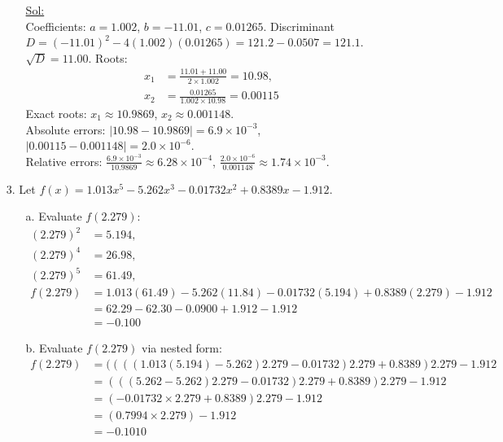 \begin{enumerate}
\begin{itemize}
        \underline{Sol:} \\
        Coefficients: \( a = 1.002 \), \( b = -11.01 \), \( c = 0.01265 \).
        Discriminant \( D = (-11.01)^2 - 4(1.002)(0.01265) = 121.2 -
        0.0507 = 121.1 \).
        \( \sqrt{D} = 11.00 \).
        Roots:
        \[
          \begin{aligned}
            x_1 &= \frac{11.01 + 11.00}{2 \times 1.002} = 10.98, \\
            x_2 &= \frac{0.01265}{1.002 \times 10.98} = 0.00115
          \end{aligned}
        \]
        Exact roots: \( x_1 \approx 10.9869 \), \( x_2 \approx 0.001148 \). \\
        Absolute errors: \( |10.98 - 10.9869| = 6.9 \times 10^{-3}
        \), \( |0.00115 - 0.001148| = 2.0 \times 10^{-6} \).  \\
        Relative errors: \( \frac{6.9 \times 10^{-3}}{10.9869}
        \approx 6.28 \times 10^{-4} \), \( \frac{2.0 \times
        10^{-6}}{0.001148} \approx 1.74 \times 10^{-3} \).

        \bigbreak
    \end{itemize}

  \item[3.] Let \(f(x) = 1.013x^5 - 5.262x^3 - 0.01732x^2 + 0.8389x - 1.912.\)
    \begin{itemize}
      \item[a.] Evaluate \(f(2.279)\):
        \[
          \begin{aligned}
            (2.279)^2 &= 5.194, \\
            (2.279)^4 &= 26.98, \\
            (2.279)^5 &= 61.49, \\
            f(2.279) &= 1.013(61.49) - 5.262(11.84) - 0.01732(5.194)
            + 0.8389(2.279) - 1.912 \\
            &= 62.29 - 62.30 - 0.0900 + 1.912 - 1.912 \\
            &= \boxed{-0.100}
          \end{aligned}
        \]
        \bigbreak

      \item[b.] Evaluate \( f(2.279) \) via nested form:
        \[
          \begin{aligned}
            f(2.279) &= ((((1.013(5.194) -
              5.262)2.279 - 0.01732)2.279 + 0.8389)2.279 - 1.912 \\
              &= (((5.262 - 5.262)2.279 - 0.01732)2.279 +
              0.8389)2.279 - 1.912 \\
              &= (-0.01732 \times 2.279 + 0.8389)2.279 - 1.912 \\
              &= (0.7994 \times 2.279) - 1.912 \\
              &= \boxed{-0.1010}
            \end{aligned}
          \]


\end{itemize}
\end{enumerate}
